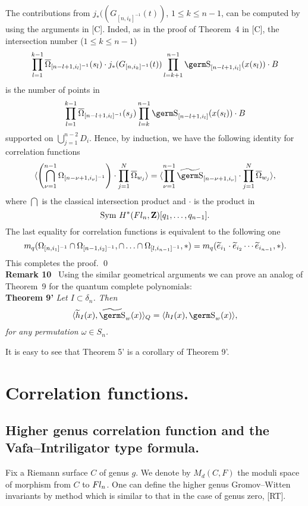 {{The contributions from $j_*((G_{[n,i_k]^{-1}}(t))$, $1\le k\le n-1$, can
be computed by using the arguments in [C]. Inded, as in the proof of 
Theorem~4 in [C], the intersection number ($1\le k\le n-1$)
$$\prod_{l=1}^{k-1}\overline\Omega_{[n-l+1,i_l]^{-1}}
(s_l)\cdot j_*(G_{[n,i_k]^{-1}}(t))\prod_{l=k+1}^{n-1}\s_{[n-l+1,i_l]}
(x(s_l))\cdot B
$$
is the number of points in
$$\prod_{l=1}^{k-1}\overline\Omega_{[n-l+1,i_l]^{-1}}
(s_j)\prod_{l=k}^{n-1}\s_{[n-l+1,i_l]}(x(s_l))\cdot B
$$
supported on $\bigcup_{j=1}^{n-2}D_i$. Hence, by induction, we have the
following identity for correlation functions
$$\langle\left(\bigcap_{\nu =1}^{n-1}\Omega_{[n-\nu +1,i_{\nu}]^{-1}}\right)
\cdot\prod_{j=1}^N\overline\Omega_{w_j}\rangle =\langle\prod_{\nu =1}^{n-1}
\wt{\s}_{[n-\nu +1,i_{\nu}]}\cdot\prod_{j=1}^N\overline\Omega_{w_j}\rangle ,
$$
where $\bigcap$ is the classical intersection product and $\cdot$ is the 
product in 
$${\rm Sym}~H^*(Fl_n,{\bf Z})[q_1,\ldots ,q_{n-1}]. 
$$
The last equality
for correlation functions is equivalent to the following one
\[ m_q(\Omega_{[n,i_1]^{-1}}\cap \Omega_{[n-1,i_2]^{-1}}, \cap\ldots\cap
\Omega_{[l,i_{n-1}]^{-1}}, *) =m_q(\widetilde e_{i_1}\cdot\widetilde e_{i_2}\cdots
\widetilde e_{i_{n-1}},*).
\] 
This completes the proof.
\qed \medskip \\ 
{\bf Remark 10} \ Using the similar geometrical arguments we can prove an 
analog of Theorem~9 for the quantum complete polynomials: \smallskip \\
{\bf Theorem 9'} {\it Let $I\subset\delta_n$. Then
$$\langle\wt h_I(x),\wt{\s}_w(x)\rangle_Q=\langle h_I(x),\s_w(x)\rangle,
$$
for any permutation $\omega\in S_n$.}

It is easy to see that Theorem 5' is a corollary of Theorem 9'.

\section{Correlation functions.}

\subsection{Higher genus correlation function and the 
Vafa--Intriligator type formula.}

Fix a Riemann surface $C$ of genus $g$. We denote by $M_d(C,F)$ the moduli 
space of morphism from $C$ to $\hbox{$Fl_n$} $. One can define the higher genus 
Gromov--Witten invariants by method which is similar to that in the 
case of genus zero, [RT].

}}
